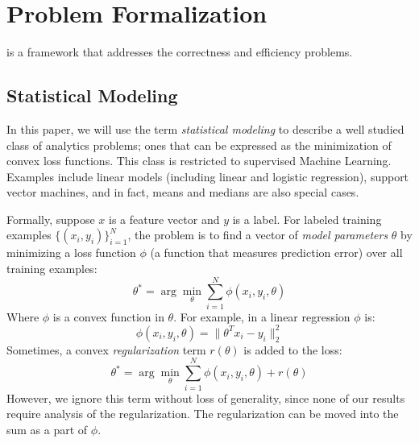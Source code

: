\section{Problem Formalization}\label{statements}
\noindent \sys is a framework that addresses the correctness and efficiency problems.

\subsection{Statistical Modeling}
In this paper, we will use the term \emph{statistical modeling} to describe a well studied class of analytics problems; ones that can be expressed as the minimization of convex loss functions.
This class is restricted to supervised Machine Learning.
Examples include linear models (including linear and logistic regression), support vector machines, and in fact, means and medians are also special cases. 

Formally, suppose $x$ is a feature vector and $y$ is a label.
For labeled training examples $\{(x_{i},y_{i})\}_{i=1}^{N}$, the problem is to find a vector of \emph{model parameters} $\theta$ by minimizing a loss function $\phi$ (a function that measures prediction error) over all training examples:
\[
 \theta^{*}=\arg\min_{\theta}\sum_{i=1}^{N}\phi(x_{i},y_{i},\theta)
\]
Where $\phi$ is a convex function in $\theta$.
For example, in a linear regression $\phi$ is:
\[
\phi(x_{i},y_{i},\theta) = \|\theta^Tx_{i} - y_i \|_2^2
\]
Sometimes, a convex \emph{regularization} term $r(\theta)$ is added to the loss:
\[
 \theta^{*}=\arg\min_{\theta}\sum_{i=1}^{N}\phi(x_{i},y_{i},\theta) + r(\theta)
\]
However, we ignore this term without loss of generality, since none of our results require analysis of the regularization.
The regularization can be moved into the sum as a part of $\phi$.

